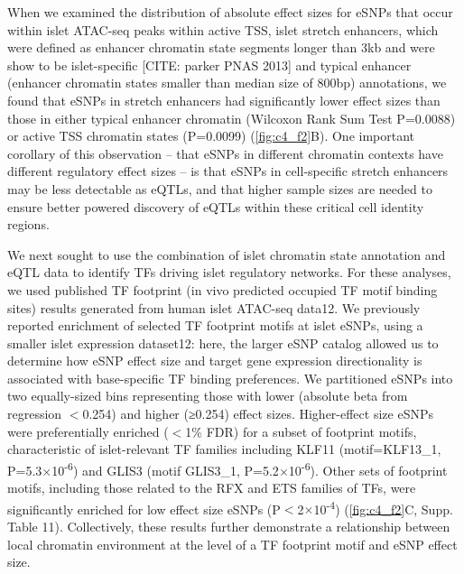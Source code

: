 When we examined the distribution of absolute effect sizes for eSNPs that occur within islet ATAC-seq peaks within active TSS, islet stretch enhancers, which were defined as enhancer chromatin state segments longer than 3kb and were show to be islet-specific [CITE: parker PNAS 2013] and typical enhancer (enhancer chromatin states smaller than median size of 800bp) annotations, we found that eSNPs in stretch enhancers had significantly lower effect sizes than those in either typical enhancer chromatin (Wilcoxon Rank Sum Test P=0.0088) or active TSS chromatin states (P=0.0099) (\ref{fig:c4_f2}B). One important corollary of this observation – that eSNPs in different chromatin contexts have different regulatory effect sizes – is that eSNPs in cell-specific stretch enhancers may be less detectable as eQTLs, and that higher sample sizes are needed to ensure better powered discovery of eQTLs within these critical cell identity regions.

We next sought to use the combination of islet chromatin state annotation and eQTL data to identify TFs driving islet regulatory networks. For these analyses, we used published TF footprint (in vivo predicted occupied TF motif binding sites) results generated from human islet ATAC-seq data12. We previously reported enrichment of selected TF footprint motifs at islet eSNPs, using a smaller islet expression dataset12: here, the larger eSNP catalog allowed us to determine how eSNP effect size and target gene expression directionality is associated with base-specific TF binding preferences. We partitioned eSNPs into two equally-sized bins representing those with lower (absolute beta from regression $<$0.254) and higher (≥0.254) effect sizes. Higher-effect size eSNPs were preferentially enriched ($<$1\% FDR) for a subset of footprint motifs, characteristic of islet-relevant TF families including KLF11 (motif=KLF13_1, P=5.3$\times$10\textsuperscript{-6}) and GLIS3 (motif GLIS3_1, P=5.2$\times$10\textsuperscript{-6}). Other sets of footprint motifs, including those related to the RFX and ETS families of TFs, were significantly enriched for low effect size eSNPs (P$<$2$\times$10\textsuperscript{-4}) (\ref{fig:c4_f2}C, Supp. Table 11). Collectively, these results further demonstrate a relationship between local chromatin environment at the level of a TF footprint motif and eSNP effect size. 	
 	
